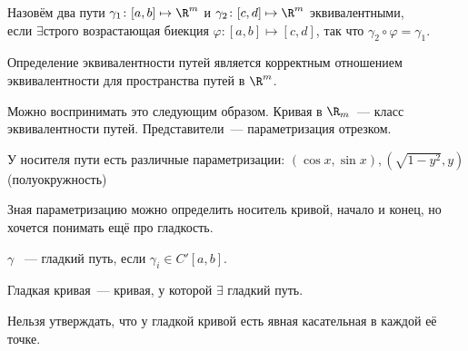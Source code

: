 \begin{definition}
    Назовём два пути $\gamma_1\colon [a,b]\mapsto \R^m$ и
    $\gamma_2\colon [c,d]\mapsto \R^m$ эквивалентными,\\
    если $\exists \text{строго возрастающая биекция }
    \varphi\colon [a,b]\mapsto[c, d]$, так что 
    $\gamma_2\circ \varphi = \gamma_1$.
\end{definition}
\begin{remark}
    Определение эквивалентности путей является корректным отношением эквивалентности для пространства путей в $\R^m$.

    Можно воспринимать это следующим образом.
    Кривая в $\R_m$~--- класс эквивалентности путей. Представители~--- параметризация отрезком.
\end{remark}
\begin{example}
    У носителя пути есть различные параметризации:
    $(\cos x, \sin x), (\sqrt{1 - y^2}, y)$(полуокружность)
\end{example}
\begin{remark}
    Зная параметризацию можно определить носитель кривой,
    начало и конец, но хочется понимать ещё про гладкость.
\end{remark}
\begin{definition}
    $\gamma$ ~--- гладкий путь, если $\gamma_i\in C'[a,b]$.\\
\end{definition}
\begin{definition}
    Гладкая кривая~--- кривая, у которой $\exists$ гладкий путь.
\end{definition}
\begin{remark}
    Нельзя утверждать, что у гладкой кривой есть явная касательная
    в каждой её точке.
\end{remark}
